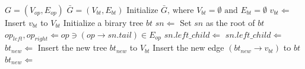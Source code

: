         \begin{algorithm}[ht!]    \caption{}
        \begin{algorithmic}[1]
            \Require    $G = ( V_{op} , E_{op} )$ 
            \Ensure     $\bar{G} = ( V_{bt} , E_{bt} )$ 
            \State      Initialize $\bar{G} \textrm{, where } V_{bt} = \emptyset \textrm{ and } E_{bt} = \emptyset $
              \label{line:forroots}   
                \State      $v_{bt} \Leftarrow $
                \State      Insert $v_{bt}$ to $V_{bt}$
            \EndFor                                                                    \label{line:forroote}
            \Statex %
                     \label{line:bbts}
                \State      Initialize a birary tree $bt$
                \State      $sn \Leftarrow$ 
                \State      Set $sn$ as the root of $bt$
                \State      {}
                \State      {}
            \EndFunction                                \label{line:bbte}
            \Statex %
                      \label{line:gbts}
                     
                    \State      $op_{left}, op_{right} \Leftarrow op \ni (op \rightarrow sn.tail) \in E_{op}$ 
                      \label{line:deg}  \label{line:growifs}
                        \State      $sn.left\_child \Leftarrow$ 
                        \State      {}
                        \State      $sn.left\_child \Leftarrow$ 
                        \State      {}     \label{line:growife}
                    \Else       \label{line:growelses}
                        \State      $bt_{new} \Leftarrow$ 
                        \State      Insert the new tree $bt_{new}$ to $V_{bt}$
                        \State      Insert the new edge $(bt_{new} \rightarrow v_{bt})$ to $bt$
                        \State      $bt_{new} \Leftarrow$ 

\end{algorithmic}
\end{algorithm}
